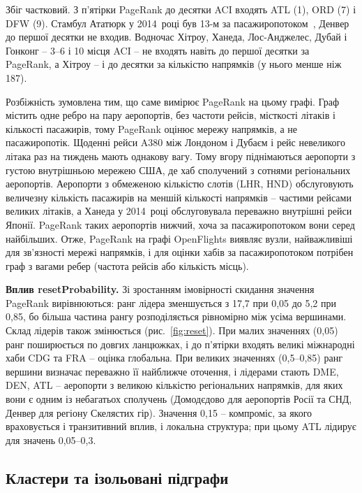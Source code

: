 \documentclass{iasa-lab}
\begin{document}
Збіг частковий. З п'ятірки PageRank до десятки ACI входять ATL (1), ORD (7) і DFW (9). Стамбул Ататюрк у 2014~році був 13-м за пасажиропотоком~\cite{aci2014-prelim}, Денвер до першої десятки не входив. Водночас Хітроу, Ханеда, Лос-Анджелес, Дубай і Гонконг -- 3--6 і 10 місця ACI -- не входять навіть до першої десятки за PageRank, а Хітроу -- і до десятки за кількістю напрямків (у нього менше ніж 187).

Розбіжність зумовлена тим, що саме вимірює PageRank на цьому графі. Граф містить одне ребро на пару аеропортів, без частоти рейсів, місткості літаків і кількості пасажирів, тому PageRank оцінює мережу напрямків, а не пасажиропотік. Щоденні рейси A380 між Лондоном і Дубаєм і рейс невеликого літака раз на тиждень мають однакову вагу. Тому вгору піднімаються аеропорти з густою внутрішньою мережею США, де хаб сполучений з сотнями регіональних аеропортів. Аеропорти з обмеженою кількістю слотів (LHR, HND) обслуговують величезну кількість пасажирів на меншій кількості напрямків -- частими рейсами великих літаків, а Ханеда у 2014~році обслуговувала переважно внутрішні рейси Японії. PageRank таких аеропортів нижчий, хоча за пасажиропотоком вони серед найбільших. Отже, PageRank на графі OpenFlights виявляє вузли, найважливіші для зв'язності мережі напрямків, і для оцінки хабів за пасажиропотоком потрібен граф з вагами ребер (частота рейсів або кількість місць).

\textbf{Вплив resetProbability.} Зі зростанням імовірності скидання значення PageRank вирівнюються: ранг лідера зменшується з 17,7 при 0,05 до 5,2 при 0,85, бо більша частина рангу розподіляється рівномірно між усіма вершинами. Склад лідерів також змінюється (рис.~\ref{fig:reset}). При малих значеннях (0,05) ранг поширюється по довгих ланцюжках, і до п'ятірки входять великі міжнародні хаби CDG та FRA -- оцінка глобальна. При великих значеннях (0,5--0,85) ранг вершини визначає переважно її найближче оточення, і лідерами стають DME, DEN, ATL -- аеропорти з великою кількістю регіональних напрямків, для яких вони є одним із небагатьох сполучень (Домодєдово для аеропортів Росії та СНД, Денвер для регіону Скелястих гір). Значення 0,15 -- компроміс, за якого враховується і транзитивний вплив, і локальна структура; при цьому ATL лідирує для значень 0,05--0,3.

\subsection{Кластери та ізольовані підграфи}
\end{document}
